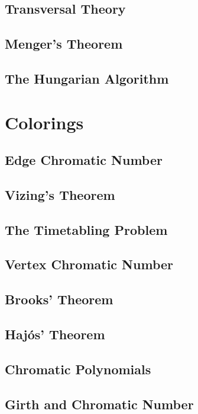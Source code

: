 			\section{Transversal Theory}

			\section{Menger's Theorem}

			\section{The Hungarian Algorithm}

		\chapter{Colorings}
			\section{Edge Chromatic Number}

			\section{Vizing's Theorem}

			\section{The Timetabling Problem}

			\section{Vertex Chromatic Number}

			\section{Brooks' Theorem}

			\section{Haj\'{o}s' Theorem}

			\section{Chromatic Polynomials}

			\section{Girth and Chromatic Number}

